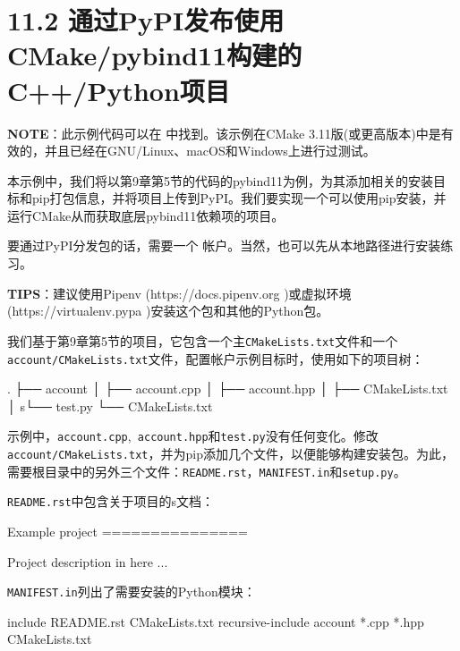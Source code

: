 \section{11.2 通过PyPI发布使用CMake/pybind11构建的C++/Python项目}

\begin{myInfoBox}
\textbf{NOTE}：此示例代码可以在  中找到。该示例在CMake 3.11版(或更高版本)中是有效的，并且已经在GNU/Linux、macOS和Windows上进行过测试。
\end{myInfoBox}

本示例中，我们将以第9章第5节的代码的pybind11为例，为其添加相关的安装目标和pip打包信息，并将项目上传到PyPI。我们要实现一个可以使用pip安装，并运行CMake从而获取底层pybind11依赖项的项目。


要通过PyPI分发包的话，需要一个 帐户。当然，也可以先从本地路径进行安装练习。

\begin{myInfoBox}
\textbf{TIPS}：建议使用Pipenv (https://docs.pipenv.org )或虚拟环境(https://virtualenv.pypa )安装这个包和其他的Python包。
\end{myInfoBox}

我们基于第9章第5节的项目，它包含一个主\texttt{CMakeLists.txt}文件和一个\texttt{account/CMakeLists.txt}文件，配置帐户示例目标时，使用如下的项目树：

\begin{codebox}[shell]
.
├── account
│    ├── account.cpp
│    ├── account.hpp
│    ├── CMakeLists.txt
│    s└── test.py
└── CMakeLists.txt
\end{codebox}

示例中，\texttt{account.cpp},\texttt{ account.hpp}和\texttt{test.py}没有任何变化。修改\texttt{account/CMakeLists.txt}，并为pip添加几个文件，以便能够构建安装包。为此，需要根目录中的另外三个文件：\texttt{README.rst}，\texttt{MANIFEST.in}和\texttt{setup.py}。

\texttt{README.rst}中包含关于项目的s文档：

\begin{codebox}[text]
Example project
===============

Project description in here ...
\end{codebox}

\texttt{MANIFEST.in}列出了需要安装的Python模块：

\begin{codebox}[text]
include README.rst CMakeLists.txt
recursive-include account *.cpp *.hpp CMakeLists.txt
\end{codebox}

